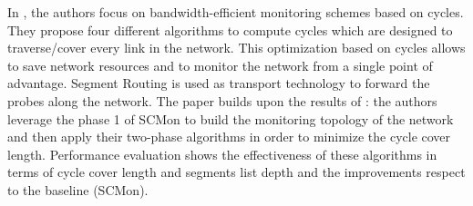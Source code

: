 In \cite{li2018bandwidth}, the authors focus on bandwidth-efficient monitoring schemes based on cycles. They propose four different algorithms to compute cycles which are designed to traverse/cover every link in the network. This optimization based on cycles allows to save network resources and to monitor the network from a single point of advantage. Segment Routing is used as transport technology to forward the probes along the network. The paper builds upon the results of \cite{scmon}: the authors leverage the phase 1 of SCMon to build the monitoring topology of the network and then apply their two-phase algorithms in order to minimize the cycle cover length. 
Performance evaluation shows the effectiveness of these algorithms in terms of cycle cover length and segments list depth and the improvements respect to the baseline (SCMon). 



